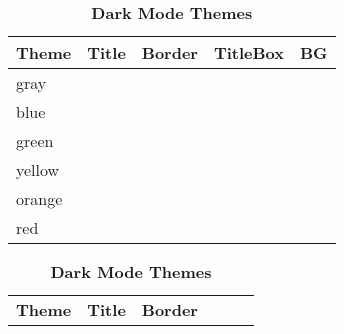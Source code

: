 \documentclass[12pt,onecolumn]{article}
\begin{document}
    \begin{table}[ht]
      \centering
      \renewcommand{\arraystretch}{1.15}

      \begin{subtable}[t]{0.48\textwidth}
        \centering
        \caption{\textbf{Light Themes (Default)}}
        \label{tab:light-themes}

        \scriptsize
        \begin{tabular}{@{}lllll@{}}
          \toprule
          \rowcolor{ktblue-titlebox}
          \textcolor{ktblue-title}{\textbf{Theme}} &
          \textcolor{ktblue-title}{\textbf{Title}} &
          \textcolor{ktblue-title}{\textbf{Border}} &
          \textcolor{ktblue-title}{\textbf{TitleBox}} &
          \textcolor{ktblue-title}{\textbf{BG}} \\
          \midrule
          gray   & \cellcolor{ktgray-title}   & \cellcolor{ktgray-border}   & \cellcolor{ktgray-titlebox}   & \cellcolor{ktgray-bg} \\
          blue   & \cellcolor{ktblue-title}   & \cellcolor{ktblue-border}   & \cellcolor{ktblue-titlebox}   & \cellcolor{ktblue-bg} \\
          green  & \cellcolor{ktgreen-title}  & \cellcolor{ktgreen-border}  & \cellcolor{ktgreen-titlebox}  & \cellcolor{ktgreen-bg} \\
          yellow & \cellcolor{ktyellow-title} & \cellcolor{ktyellow-border} & \cellcolor{ktyellow-titlebox} & \cellcolor{ktyellow-bg} \\
          orange & \cellcolor{ktorange-title} & \cellcolor{ktorange-border} & \cellcolor{ktorange-titlebox} & \cellcolor{ktorange-bg} \\
          red    & \cellcolor{ktred-title}    & \cellcolor{ktred-border}    & \cellcolor{ktred-titlebox}    & \cellcolor{ktred-bg} \\
          \bottomrule
        \end{tabular}
      \end{subtable}
      \hfill
      \begin{subtable}[t]{0.48\textwidth}
        \centering
        \caption{\textbf{Dark Mode Themes}}
        \label{tab:dark-themes}
        \scriptsize
        \begin{tabular}{@{}llllll@{}}
          \toprule
          \rowcolor{ktblue-titlebox}
          \textcolor{ktblue-title}{\textbf{Theme}} &
          \textcolor{ktblue-title}{\textbf{Title}} &
          \textcolor{ktblue-title}{\textbf{Border}} &

\end{tabular}
\end{subtable}
\end{table}
\end{document}
